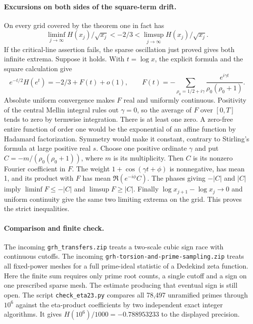 \paragraph{Excursions on both sides of the square-term drift.}
On every grid covered by the theorem one in fact has
\[
   \liminf_{j\to\infty} H(x_j)/\sqrt{x_j} < -2/3
   < \limsup_{j\to\infty} H(x_j)/\sqrt{x_j}.
\]
If the critical-line assertion fails, the sparse oscillation just proved gives both infinite extrema. Suppose it holds. With $t=\log x$, the explicit formula and the square calculation give
\[
 e^{-t/2}H(e^t)=-2/3+F(t)+o(1),\qquad
 F(t)=-\sum_{\rho_0=1/2+i\gamma}
       \frac{e^{i\gamma t}}{\rho_0(\rho_0+1)} .
\]
Absolute uniform convergence makes $F$ real and uniformly continuous. Positivity of the central Mellin integral rules out $\gamma=0$, so the average of $F$ over $[0,T]$ tends to zero by termwise integration. There is at least one zero. A zero-free entire function of order one would be the exponential of an affine function by Hadamard factorization. Symmetry would make it constant, contrary to Stirling's formula at large positive real $s$.
Choose one positive ordinate $\gamma$ and put $C=-m/(\rho_0(\rho_0+1))$, where $m$ is its multiplicity. Then $C$ is its nonzero Fourier coefficient in $F$. The weight $1+\cos(\gamma t+\phi)$ is nonnegative, has mean 1, and its product with $F$ has mean $\Re(e^{-i\phi}C)$. The phases giving $-|C|$ and $|C|$ imply $\liminf F\le-|C|$ and $\limsup F\ge|C|$. Finally $\log x_{j+1}-\log x_j\to0$ and uniform continuity give the same two limiting extrema on the grid. This proves the strict inequalities.

\paragraph{Comparison and finite check.}
The incoming \texttt{grh\_transfers.zip} treats a two-scale cubic sign
race with continuous cutoffs. The incoming
\texttt{grh-torsion-and-prime-sampling.zip} treats all fixed-power
meshes for a full prime-ideal statistic of a Dedekind zeta function.
Here the finite sum requires only prime root counts, a single cutoff
and a sign on one prescribed sparse mesh. The estimate producing that
eventual sign is still open. The script \texttt{check\_eta23.py} compares
all 78,497 unramified primes through $10^6$ against the eta-product
coefficients by two independent exact integer algorithms. It gives
$H(10^6)/1000=-0.788953233$ to the displayed precision.
